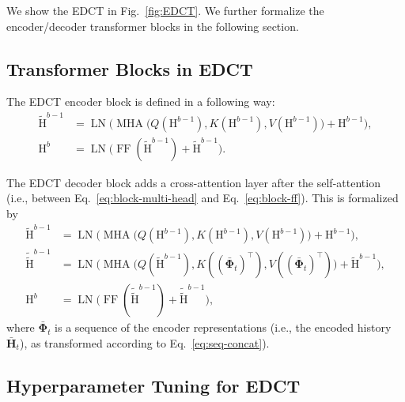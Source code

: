 \documentclass{article}
\theoremstyle{plain}
\theoremstyle{definition}
\theoremstyle{remark}
\begin{document}
We show the EDCT in Fig.~\ref{fig:EDCT}. We further formalize the encoder/decoder transformer blocks in the following section. 

\clearpage
\subsection{Transformer Blocks in EDCT} 
\label{app:EDCT-blocks}

The EDCT encoder block is defined in a following way:
\begin{align}
        \tilde{\mathrm{H}}^{b - 1} &= \operatorname{LN}\Big(\operatorname{MHA}\big(Q(\mathrm{H}^{b - 1}), K(\mathrm{H}^{b - 1}), V(\mathrm{H}^{b - 1})\big) + \mathrm{H}^{b - 1}\Big) ,
    \label{eq:block-multi-head} \\ 
     \mathrm{H}^{b} &= \operatorname{LN}\big(\operatorname{FF}(\tilde{\mathrm{H}}^{b - 1}) + \tilde{\mathrm{H}}^{b - 1}\big) . \label{eq:block-ff}
\end{align}

The EDCT decoder block adds a cross-attention layer after the self-attention (i.e., between Eq.~\eqref{eq:block-multi-head} and Eq.~\eqref{eq:block-ff}). This is formalized by 
\begin{align}
        \tilde{\mathrm{H}}^{b - 1} &= \operatorname{LN}\Big(\operatorname{MHA}\big(Q(\mathrm{H}^{b - 1}), K(\mathrm{H}^{b - 1}), V(\mathrm{H}^{b - 1})\big) + \mathrm{H}^{b - 1}\Big) ,
    \\
        \tilde{\tilde{\mathrm{H}}}^{b - 1} &=  \operatorname{LN}\Big(\operatorname{MHA}\big(Q(\tilde{\mathrm{H}}^{b - 1}), K((\bar{\mathbf{\Phi}}_t)^\top), V((\bar{\mathbf{\Phi}}_t)^\top)\big) + \tilde{\mathrm{H}}^{b - 1}\Big) , \label{eq:cross-attention} 
\\
    \mathrm{H}^{b} &= \operatorname{LN}\big(\operatorname{FF}(\tilde{\tilde{\mathrm{H}}}^{b - 1}) + \tilde{\tilde{\mathrm{H}}}^{b - 1}\big) ,
\end{align}
where $\bar{\mathbf{\Phi}}_t$ is a sequence of the encoder representations (i.e., the encoded history $\bar{\mathbf{H}}_t$), as transformed according to Eq.~\eqref{eq:seq-concat}).   

\subsection{Hyperparameter Tuning for EDCT} 
\label{app:EDCT-hyparams}
\end{document}
